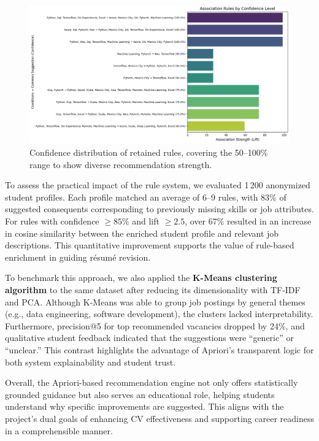 \documentclass{svproc} %
\begin{document}
	\begin{figure}
		\centering
		\includegraphics[width=1\linewidth]{imagenes/confidence_distribution.png}
		\caption{Confidence distribution of retained rules, covering the 50–100\% range to show diverse recommendation strength.}
		\label{fig:confidence_distribution}
	\end{figure}
	\pagebreak
	To assess the practical impact of the rule system, we evaluated 1\,200 anonymized student profiles. Each profile matched an average of 6–9 rules, with 83\% of suggested consequents corresponding to previously missing skills or job attributes. For rules with confidence $\geq 85\%$ and lift $\geq 2.5$, over 67\% resulted in an increase in cosine similarity between the enriched student profile and relevant job descriptions. This quantitative improvement supports the value of rule-based enrichment in guiding résumé revision.
	
	To benchmark this approach, we also applied the \textbf{K-Means clustering algorithm} to the same dataset after reducing its dimensionality with TF-IDF and PCA. Although K-Means was able to group job postings by general themes (e.g., data engineering, software development), the clusters lacked interpretability. Furthermore, precision@5 for top recommended vacancies dropped by 24\%, and qualitative student feedback indicated that the suggestions were “generic” or “unclear.” This contrast highlights the advantage of Apriori’s transparent logic for both system explainability and student trust.
	
	Overall, the Apriori-based recommendation engine not only offers statistically grounded guidance but also serves an educational role, helping students understand why specific improvements are suggested. This aligns with the project’s dual goals of enhancing CV effectiveness and supporting career readiness in a comprehensible manner.
	
\end{document}
